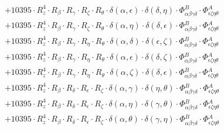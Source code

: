 \documentclass{article}
\begin{document}
\begin{equation}
\begin{array}{c}
 \\[0.2em] 		 + 10395 \cdot R_{z}^{4} \cdot R_{\beta{}} \cdot R_{\gamma{}} \cdot R_{\zeta{}} \cdot R_{\theta{}} \cdot \delta{}\left(\alpha{}, \epsilon{}\right) \cdot \delta{}\left(\delta{}, \eta{}\right) \cdot \Phi{}^{B}_{\alpha{}\beta{}\gamma{}\delta{}} \cdot \Phi{}^{A}_{\epsilon{}\zeta{}\eta{}\theta{}} 
 \\[0.2em] 		 + 10395 \cdot R_{z}^{4} \cdot R_{\beta{}} \cdot R_{\gamma{}} \cdot R_{\zeta{}} \cdot R_{\theta{}} \cdot \delta{}\left(\alpha{}, \eta{}\right) \cdot \delta{}\left(\delta{}, \epsilon{}\right) \cdot \Phi{}^{B}_{\alpha{}\beta{}\gamma{}\delta{}} \cdot \Phi{}^{A}_{\epsilon{}\zeta{}\eta{}\theta{}} 
 \\[0.2em] 		 + 10395 \cdot R_{z}^{4} \cdot R_{\beta{}} \cdot R_{\gamma{}} \cdot R_{\eta{}} \cdot R_{\theta{}} \cdot \delta{}\left(\alpha{}, \delta{}\right) \cdot \delta{}\left(\epsilon{}, \zeta{}\right) \cdot \Phi{}^{B}_{\alpha{}\beta{}\gamma{}\delta{}} \cdot \Phi{}^{A}_{\epsilon{}\zeta{}\eta{}\theta{}} 
 \\[0.2em] 		 + 10395 \cdot R_{z}^{4} \cdot R_{\beta{}} \cdot R_{\gamma{}} \cdot R_{\eta{}} \cdot R_{\theta{}} \cdot \delta{}\left(\alpha{}, \epsilon{}\right) \cdot \delta{}\left(\delta{}, \zeta{}\right) \cdot \Phi{}^{B}_{\alpha{}\beta{}\gamma{}\delta{}} \cdot \Phi{}^{A}_{\epsilon{}\zeta{}\eta{}\theta{}} 
 \\[0.2em] 		 + 10395 \cdot R_{z}^{4} \cdot R_{\beta{}} \cdot R_{\gamma{}} \cdot R_{\eta{}} \cdot R_{\theta{}} \cdot \delta{}\left(\alpha{}, \zeta{}\right) \cdot \delta{}\left(\delta{}, \epsilon{}\right) \cdot \Phi{}^{B}_{\alpha{}\beta{}\gamma{}\delta{}} \cdot \Phi{}^{A}_{\epsilon{}\zeta{}\eta{}\theta{}} 
 \\[0.2em] 		 + 10395 \cdot R_{z}^{4} \cdot R_{\beta{}} \cdot R_{\delta{}} \cdot R_{\epsilon{}} \cdot R_{\zeta{}} \cdot \delta{}\left(\alpha{}, \gamma{}\right) \cdot \delta{}\left(\eta{}, \theta{}\right) \cdot \Phi{}^{B}_{\alpha{}\beta{}\gamma{}\delta{}} \cdot \Phi{}^{A}_{\epsilon{}\zeta{}\eta{}\theta{}} 
 \\[0.2em] 		 + 10395 \cdot R_{z}^{4} \cdot R_{\beta{}} \cdot R_{\delta{}} \cdot R_{\epsilon{}} \cdot R_{\zeta{}} \cdot \delta{}\left(\alpha{}, \eta{}\right) \cdot \delta{}\left(\gamma{}, \theta{}\right) \cdot \Phi{}^{B}_{\alpha{}\beta{}\gamma{}\delta{}} \cdot \Phi{}^{A}_{\epsilon{}\zeta{}\eta{}\theta{}} 
 \\[0.2em] 		 + 10395 \cdot R_{z}^{4} \cdot R_{\beta{}} \cdot R_{\delta{}} \cdot R_{\epsilon{}} \cdot R_{\zeta{}} \cdot \delta{}\left(\alpha{}, \theta{}\right) \cdot \delta{}\left(\gamma{}, \eta{}\right) \cdot \Phi{}^{B}_{\alpha{}\beta{}\gamma{}\delta{}} \cdot \Phi{}^{A}_{\epsilon{}\zeta{}\eta{}\theta{}} 

\end{array}
\end{equation}
\end{document}
